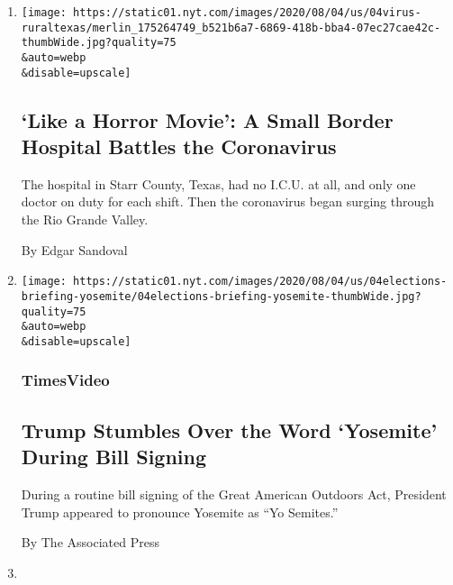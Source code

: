 \begin{enumerate}
\def\labelenumi{\arabic{enumi}.}
\item
  \href{/2020/08/04/us/texas-coronavirus-rio-grande-valley-starr-county.html}{}

  \texttt{[image: https://static01.nyt.com/images/2020/08/04/us/04virus-ruraltexas/merlin\_175264749\_b521b6a7-6869-418b-bba4-07ec27cae42c-thumbWide.jpg?quality=75\\\&auto=webp\\\&disable=upscale]}

  \hypertarget{like-a-horror-movie-a-small-border-hospital-battles-the-coronavirus}{%
  \subsection{`Like a Horror Movie': A Small Border Hospital Battles the
  Coronavirus}\label{like-a-horror-movie-a-small-border-hospital-battles-the-coronavirus}}

  The hospital in Starr County, Texas, had no I.C.U. at all, and only
  one doctor on duty for each shift. Then the coronavirus began surging
  through the Rio Grande Valley.

  By Edgar Sandoval
\item
  \href{/video/us/100000007272140/trump-stumbles-over-yosemite.html}{}

  \texttt{[image: https://static01.nyt.com/images/2020/08/04/us/04elections-briefing-yosemite/04elections-briefing-yosemite-thumbWide.jpg?quality=75\\\&auto=webp\\\&disable=upscale]}

  \hypertarget{timesvideo}{%
  \subsubsection{TimesVideo}\label{timesvideo}}

  \hypertarget{trump-stumbles-over-the-word-yosemite-during-bill-signing}{%
  \subsection{Trump Stumbles Over the Word `Yosemite' During Bill
  Signing}\label{trump-stumbles-over-the-word-yosemite-during-bill-signing}}

  During a routine bill signing of the Great American Outdoors Act,
  President Trump appeared to pronounce Yosemite as ``Yo Semites.''

  By The Associated Press
\item
  \href{/2020/08/04/us/2020-census-ending-early.html}{}


\end{enumerate}
